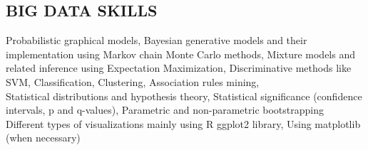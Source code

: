\documentclass[margin, 10pt]{res} %
\begin{document}
\begin{resume}
\section{BIG DATA SKILLS}
{\bf \color{Brown}{Machine Learning Skills:}} 
Probabilistic graphical models, Bayesian generative models and their implementation using Markov chain Monte Carlo methods, Mixture models and related inference using Expectation Maximization, Discriminative methods like SVM, Classification, Clustering, Association rules mining,   \\
{\bf \color{Brown}{Statistical Theory:}} Statistical distributions and hypothesis theory, Statistical significance (confidence intervals, p and q-values), Parametric and non-parametric bootstrapping \\
{\bf \color{Brown}{Statistical Visualization and reporting:}} Different types of visualizations mainly using R ggplot2 library, Using matplotlib (when necessary)



\end{resume}
\end{document}
